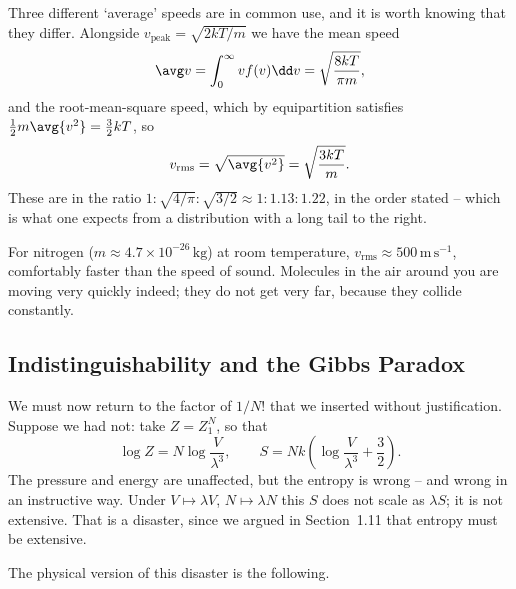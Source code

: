 \begin{center}
\end{center}

Three different `average' speeds are in common use, and it is worth knowing that they differ. Alongside $v_{\mathrm{peak}} = \sqrt{2kT/m}$ we have the mean speed
$$
\avg v = \int_0^\infty v f(v) \dd v = \sqrt{\frac{8kT}{\pi m}},
$$
and the root-mean-square speed, which by equipartition satisfies $\tfrac 12 m \avg{v^2} = \tfrac 32 kT$, so
$$
v_{\mathrm{rms}} = \sqrt{\avg{v^2}} = \sqrt{\frac{3kT}{m}}.
$$
These are in the ratio $1 : \sqrt{4/\pi} : \sqrt{3/2} \approx 1 : 1.13 : 1.22$, in the order stated -- which is what one expects from a distribution with a long tail to the right.

\begin{example}
	For nitrogen ($m \approx 4.7\times 10^{-26}\,\mathrm{kg}$) at room temperature, $v_{\mathrm{rms}} \approx 500\,\mathrm{m}\,\mathrm{s}^{-1}$, comfortably faster than the speed of sound. Molecules in the air around you are moving very quickly indeed; they do not get very far, because they collide constantly.
\end{example}

\subsection{Indistinguishability and the Gibbs Paradox}\label{sec:gibbsparadox}

We must now return to the factor of $1/N!$ that we inserted without justification. Suppose we had not: take $Z = Z_1^N$, so that
$$
\log Z = N \log \frac{V}{\lambda^3}, \qquad S = Nk\left(\log\frac{V}{\lambda^3} + \frac 32\right).
$$
The pressure and energy are unaffected, but the entropy is wrong -- and wrong in an instructive way. Under $V \mapsto \lambda V$, $N \mapsto \lambda N$ this $S$ does not scale as $\lambda S$; it is not extensive. That is a disaster, since we argued in Section~1.11 that entropy must be extensive.

The physical version of this disaster is the following.

